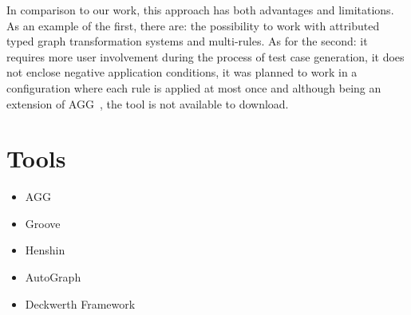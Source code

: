 In comparison to our work, this approach has both advantages and limitations. As an example of the first, there are: the possibility to work with attributed typed graph transformation systems and multi-rules. As for the second: it requires more user involvement during the process of test case generation, it does not enclose negative application conditions, it was planned to work in a configuration where each rule is applied at most once and although being an extension of
AGG~\cite{Taentzer2000}, the tool is not available to download.

\section{Tools}


\begin{itemize}
\item AGG
\item Groove
\item Henshin
\item AutoGraph
\item Deckwerth Framework
\end{itemize}
